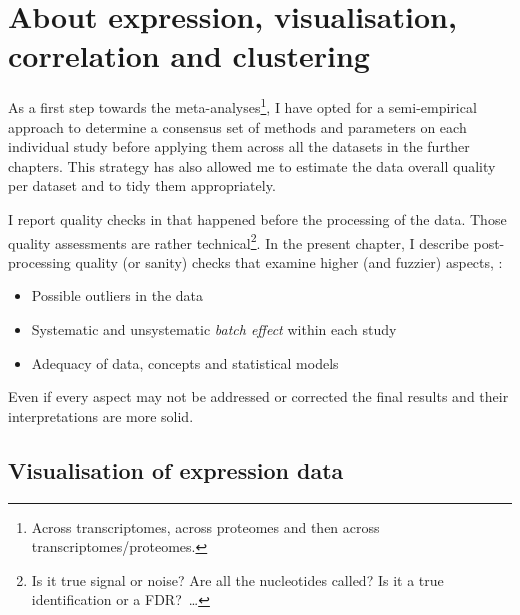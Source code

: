 \chapter{About expression, visualisation, correlation and clustering}
\label{ch:expression}

\begin{comment}
\setlength{\epigraphwidth}{\textwidth}%
\setlength{\epigraphrule}{0pt}%
\epigraphhead[70]{%
\epigraph{[..] 80\% of the data analysis task is spent on cleaning and
understanding the data.}{\cite{Dasu2003-bg}}%
}
\end{comment}

As a first step towards the meta-analyses\footnote{Across transcriptomes,
across proteomes and then across transcriptomes/proteomes.},
I have opted for a semi-empirical approach to determine
a consensus set of methods and parameters on each individual study
before applying them across all the datasets in the further chapters.
This strategy has also allowed me
to estimate the data overall quality per dataset and to tidy them appropriately.

I report quality checks in 
that happened before the processing of the data.
Those quality assessments are rather technical\footnote{Is it true signal
or noise?
Are all the nucleotides called?
Is it a true identification or a \gls{FDR}?~\ldots}.
In the present chapter, I describe post-processing quality (or sanity) checks
that examine higher (and fuzzier) aspects, \eg:
\begin{itemize}[topsep=0pt,nosep]
    \item Possible outliers in the data
    \item Systematic and unsystematic \emph{batch effect} within each study
    \item Adequacy of data, concepts and statistical models
\end{itemize}
Even if every aspect may not be addressed or corrected the
final results and their interpretations are more solid.

\section{Visualisation of expression data}

